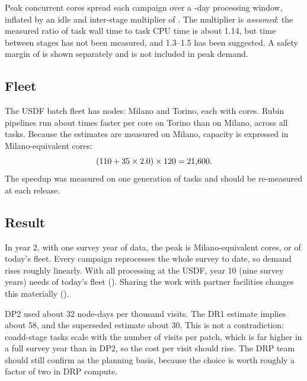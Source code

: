 Peak concurrent cores spread each campaign over a \smWindowDays{}-day
processing window, inflated by an idle and inter-stage multiplier of \smIdle{}.
The multiplier is \emph{assumed}: the measured ratio of task wall time to task
CPU time is about 1.14, but time between stages has not been measured, and
1.3--1.5 has been suggested. A safety margin of \smSafety{} is shown
separately and is not included in peak demand.

\subsection{Fleet}

The USDF batch fleet has \smBatchNodes{} nodes: \smMilano{} Milano and
\smTorino{} Torino, each with \smCoresNode{} cores. Rubin pipelines run about
\smSpeedup{} times faster per core on Torino than on Milano, across all tasks.
Because the estimates are measured on Milano, capacity is expressed in
Milano-equivalent cores:
\[
  (110{} + 35{} \times 2.0{}) \times 120{} = \mbox{21,600{}} .
\]
The speedup was measured on one generation of tasks and should
be re-measured at each release.

\subsection{Result}

In year 2, with one survey year of data, the peak is \smDRonePeakCores{}
Milano-equivalent cores, or \smDRoneUtil{} of today's fleet. Every campaign
reprocesses the whole survey to date, so demand rises roughly linearly. With
all processing at the USDF, year 10 (nine survey years) needs \smDRnineUtil{}
of today's fleet (). Sharing the
work with partner facilities changes this materially ().

DP2 used about 32 node-days per thousand visits. The \vthirty{} DR1
estimate implies about 58, and the superseded \wfortyone{} estimate about 30.
This is not a contradiction: coadd-stage tasks scale with the number of
visits per patch, which is far higher in a full survey year than in DP2, so
the cost per visit should rise. The DRP team should still confirm
\vthirty{} as the planning basis, because the choice is worth roughly a
factor of two in DRP compute.

\begin{landscape}

\end{landscape}
